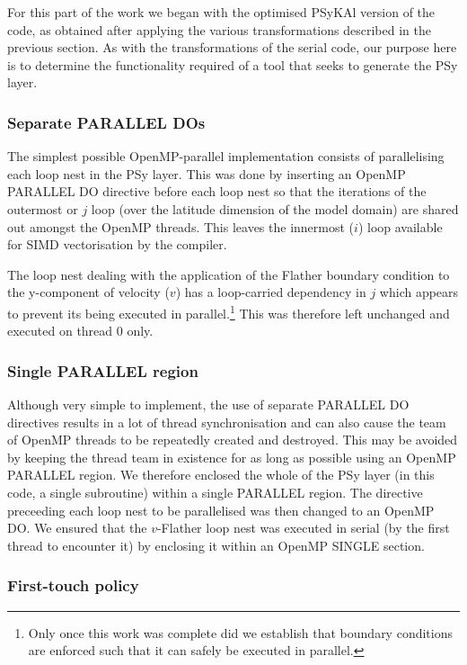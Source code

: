 \documentclass[gmdd, manuscript]{copernicus}
\begin{document}
For this part of the work we began with the optimised {PS}y{KA}l
version of the code, as obtained after applying the various
transformations described in the previous section. As with the
transformations of the serial code, our purpose here is to determine
the functionality required of a tool that seeks to generate the PSy
layer.

\subsubsection{Separate PARALLEL DOs}
\label{sec_sep_dos}

The simplest possible OpenMP-parallel implementation consists of
parallelising each loop nest in the PSy layer. This was done by
inserting an OpenMP PARALLEL DO directive before each loop nest so
that the iterations of the outermost or $j$ loop (over the latitude
dimension of the model domain) are shared out amongst the OpenMP
threads. This leaves the innermost ($i$) loop available for SIMD
vectorisation by the compiler.

The loop nest dealing with the application of the Flather boundary
condition to the y-component of velocity ($v$) has a loop-carried
dependency in $j$ which appears to prevent its being executed in
parallel.\footnote{Only once this work was complete did we establish
  that boundary conditions are enforced such that it can safely be
  executed in parallel.}  This was therefore left unchanged and
executed on thread 0 only.

\subsubsection{Single PARALLEL region}
\label{sec_single_parallel}

Although very simple to implement, the use of separate PARALLEL DO
directives results in a lot of thread synchronisation and can also
cause the team of OpenMP threads to be repeatedly created and
destroyed. This may be avoided by keeping the thread team in existence
for as long as possible using an OpenMP PARALLEL region.  We therefore
enclosed the whole of the PSy layer (in this code, a single
subroutine) within a single PARALLEL region. The directive preceeding
each loop nest to be parallelised was then changed to an OpenMP DO. We
ensured that the $v$-Flather loop nest was executed in serial (by the
first thread to encounter it) by enclosing it within an OpenMP SINGLE
section.

\subsubsection{First-touch policy}
\label{sec_1sttouch}
\end{document}
